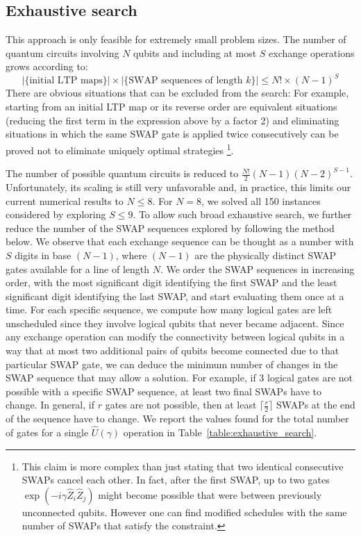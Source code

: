 \documentclass[%
onecolumn,pra,
superscriptaddress,
nofootinbib,
 amsmath,amssymb,
 aps,
11pt,
]{revtex4-1}
\begin{document}
\subsection{Exhaustive search}
\label{app:exhaustice_search}

This approach is only feasible for extremely small problem sizes. The number of quantum circuits involving $N$ qubits and including at most $S$ exchange operations grows according to:
\begin{equation}
	\left| \{ \text{initial LTP maps} \} \right| \times
	\left| \{ \text{SWAP sequences of length }k \} \right|
    \leq N! \times (N-1)^S
\end{equation}
There are obvious situations that can be excluded from the search: For example, starting from an initial LTP map or its reverse order are equivalent situations (reducing the first term in the expression above by a factor 2) and eliminating situations in which the same SWAP gate is applied twice consecutively can be proved not to eliminate uniquely optimal strategies%
\footnote{This claim is more complex than just stating that two identical consecutive SWAPs cancel each other. In fact, after the first SWAP, up to two gates $\exp{(-i \gamma  \hat{Z}_i\hat{Z}_j)}$ might become possible that were between previously unconnected qubits. However one can find modified schedules with the same number of SWAPs that satisfy the constraint.}.

The number of possible quantum circuits is reduced to $\frac{N!}{2} (N-1)(N-2)^{S-1}$. Unfortunately, its scaling is still very unfavorable and, in practice, this limits our current numerical results to $N\leq 8$. For $N=8$, we solved all 150 instances considered by exploring $S\leq 9$. To allow such broad exhaustive search, we further reduce the number of the SWAP sequences explored by following the method below.
We observe that each exchange sequence can be thought as a number with $S$ digits in base $(N-1)$, where $(N-1)$ are the physically distinct SWAP gates available for a line of length $N$. We order the SWAP sequences in increasing order, with the most significant digit identifying the first SWAP and the least significant digit identifying the last SWAP, and start evaluating them once at a time.
For each specific sequence, we compute how many logical gates are left unscheduled since they involve logical qubits that never became adjacent. Since any exchange operation can modify the connectivity between logical qubits in a way that at most two additional pairs of qubits become connected due to that particular SWAP gate, we can deduce the minimum number of changes in the SWAP sequence that may allow a solution. For example, if 3 logical gates are not possible with a specific SWAP sequence, at least two final SWAPs have to change. In general, if $r$ gates are not possible, then at least $\lceil \frac{r}{2} \rceil$ SWAPs at the end of the sequence have to change.
We report the values found for the total number of gates for a single $\hat{U}(\gamma)$ operation in Table~\ref{table:exhaustive_search}.
\end{document}

